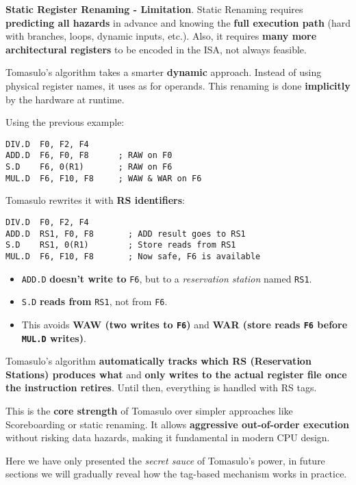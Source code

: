 \highspace
\textcolor{Red2}{ \textbf{Static Register Renaming - Limitation}}. Static Renaming requires \textbf{predicting all hazards} in advance and knowing the \textbf{full execution path} (hard with branches, loops, dynamic inputs, etc.). Also, it requires \textbf{many more architectural registers} to be encoded in the ISA, not always feasible.

\newpage

\begin{flushleft}
\end{flushleft}
Tomasulo's algorithm takes a smarter \textbf{dynamic} approach. Instead of using physical register names, it uses  as  for operands. This renaming is done \textbf{implicitly} by the hardware at runtime.

\highspace
Using the previous example:
\begin{lstlisting}[language=unknown]
DIV.D  F0, F2, F4
ADD.D  F6, F0, F8      ; RAW on F0
S.D    F6, 0(R1)       ; RAW on F6
MUL.D  F6, F10, F8     ; WAW & WAR on F6
\end{lstlisting}
Tomasulo rewrites it with \textbf{RS identifiers}:
\begin{lstlisting}[language=unknown]
DIV.D  F0, F2, F4
ADD.D  RS1, F0, F8       ; ADD result goes to RS1
S.D    RS1, 0(R1)        ; Store reads from RS1
MUL.D  F6, F10, F8       ; Now safe, F6 is available
\end{lstlisting}
\begin{itemize}
    \item \texttt{ADD.D} \textbf{doesn't write to} \texttt{F6}, but to a \emph{reservation station} named \texttt{RS1}.
    \item \texttt{S.D} \textbf{reads from} \texttt{RS1}, not from \texttt{F6}.
    \item This avoids \textbf{WAW (two writes to \texttt{F6})} and \textbf{WAR (store reads \texttt{F6} before \texttt{MUL.D} writes)}.
\end{itemize}
Tomasulo's algorithm \textbf{automatically tracks which RS (Reservation Stations) produces what} and \textbf{only writes to the actual register file once the instruction retires}. Until then, everything is handled with RS tags.

\highspace
This is the \textbf{core strength} of Tomasulo over simpler approaches like Scoreboarding or static renaming. It allows \textbf{aggressive out-of-order execution} without risking data hazards, making it fundamental in modern CPU design.

\highspace
Here we have only presented the \emph{secret sauce} of Tomasulo's power, in future sections we will gradually reveal how the tag-based mechanism works in practice.